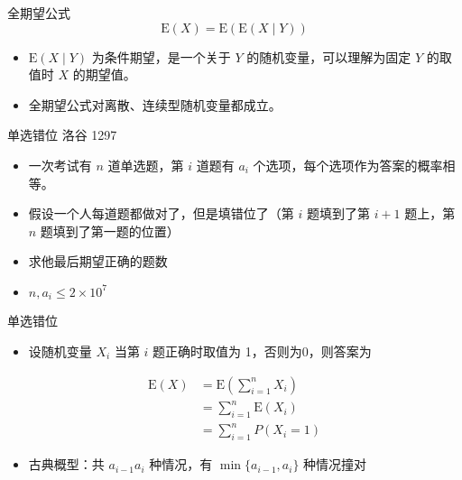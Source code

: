 \documentclass{beamer}
\newcommand{\E}{\text{E}}
\begin{document}
    \begin{frame}{全期望公式}
        $$
            \E(X) = \E(\E(X \mid Y))
        $$
        \begin{itemize}
            \setlength{\itemsep}{10pt}
            \item $\E(X\mid Y)$ 为条件期望，是一个关于 $Y$ 的随机变量，可以理解为固定 $Y$ 的取值时 $X$ 的期望值。
            \item 全期望公式对离散、连续型随机变量都成立。
        \end{itemize}
    \end{frame}

    \begin{frame}{单选错位}
        {洛谷 1297}
        \begin{itemize}
            \setlength{\itemsep}{10pt}
            \item 一次考试有 $n$ 道单选题，第 $i$ 道题有 $a_i$ 个选项，每个选项作为答案的概率相等。
            \item 假设一个人每道题都做对了，但是填错位了（第 $i$ 题填到了第 $i+1$ 题上，第 $n$ 题填到了第一题的位置）
            \item 求他最后期望正确的题数
            \item $n,a_i\le 2\times 10^7$
        \end{itemize}
    \end{frame}

    \begin{frame}{单选错位}
        \begin{itemize}
            \setlength{\itemsep}{10pt}
            \item 设随机变量 $X_i$ 当第 $i$ 题正确时取值为 1，否则为0，则答案为
        \end{itemize}
        \begin{align*}
            \E(X)
            &= \E\left(\sum_{i=1}^{n}X_i\right) \\
            &= \sum_{i=1}^n\E(X_i) \\
            &= \sum_{i=1}^n P(X_i=1)
        \end{align*}
        \begin{itemize}
            \setlength{\itemsep}{10pt}
            \item 古典概型：共 $a_{i-1}a_i$ 种情况，有 $\min\{a_{i-1},a_i\}$ 种情况撞对
        \end{itemize}
    \end{frame}
    
\end{document}

